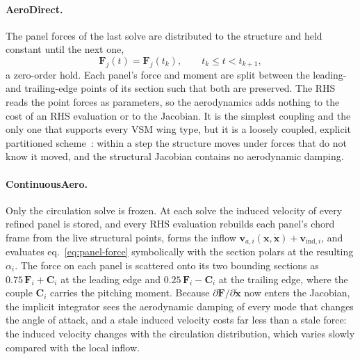 \documentclass[11pt,a4paper]{article}
\newcommand{\vect}[1]{\boldsymbol{#1}}
\begin{document}
\paragraph{AeroDirect.} The panel forces of the last solve are distributed to the structure and held constant until the next one,
\begin{equation}
  \vect{F}_j(t) = \vect{F}_j(t_k), \qquad t_k \le t < t_{k+1},
\end{equation}
a zero-order hold. Each panel's force and moment are split between the leading- and trailing-edge points of its section such that both are preserved. The RHS reads the point forces as parameters, so the aerodynamics adds nothing to the cost of an RHS evaluation or to the Jacobian. It is the simplest coupling and the only one that supports every VSM wing type, but it is a loosely coupled, explicit partitioned scheme~\citep{farhat2006}: within a step the structure moves under forces that do not know it moved, and the structural Jacobian contains no aerodynamic damping.

\paragraph{ContinuousAero.} Only the circulation solve is frozen. At each solve the induced velocity of every refined panel is stored, and every RHS evaluation rebuilds each panel's chord frame from the live structural points, forms the inflow $\vect{v}_{a,i}(\vect{x},\dot{\vect{x}}) + \vect{v}_{\mathrm{ind},i}$, and evaluates eq.~\eqref{eq:panel-force} symbolically with the section polars at the resulting $\alpha_i$. The force on each panel is scattered onto its two bounding sections as $0.75\,\vect{F}_i + \vect{C}_i$ at the leading edge and $0.25\,\vect{F}_i - \vect{C}_i$ at the trailing edge, where the couple $\vect{C}_i$ carries the pitching moment. Because $\partial\vect{F}/\partial\dot{\vect{x}}$ now enters the Jacobian, the implicit integrator sees the aerodynamic damping of every mode that changes the angle of attack, and a stale induced velocity costs far less than a stale force: the induced velocity changes with the circulation distribution, which varies slowly compared with the local inflow.
\end{document}
